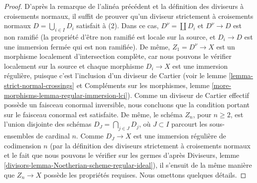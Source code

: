 \begin{proof}
\medskip\noindent
D'après la remarque de l'alinéa précédent et la définition
des diviseurs à croisements normaux, il suffit de prouver qu'un
diviseur strictement à croisements normaux $D = \bigcup_{i \in I} D_i$
satisfait à (2). Dans ce cas, $D^\nu = \coprod D_i$
et $D^\nu \to D$ est non ramifié (la propriété d'être non ramifié
est locale sur la source, et $D_i \to D$ est une immersion
fermée qui est non ramifiée). De même, $Z_1 = D^\nu \to X$
est un morphisme localement d'intersection complète, car nous pouvons
le vérifier localement sur la source et chaque morphisme $D_i \to X$
est une immersion régulière, puisque c'est l'inclusion d'un diviseur de Cartier
(voir le lemme \ref{lemma-strict-normal-crossings} et
Compléments sur les morphismes, lemme \ref{more-morphisms-lemma-regular-immersion-lci}).
Comme un diviseur de Cartier effectif possède un faisceau
conormal inversible, nous concluons que la condition portant sur le
faisceau conormal est satisfaite.
De même, le schéma $Z_n$, pour $n \geq 2$, est l'union disjointe
des schémas $D_J = \bigcap_{j \in J} D_j$, où $J \subset I$
parcourt les sous-ensembles de cardinal $n$. Comme $D_J \to X$ est
une immersion régulière de codimension $n$
(par la définition des diviseurs strictement à croisements normaux et le
fait que nous pouvons le vérifier sur les germes d'après
Diviseurs, lemme \ref{divisors-lemma-Noetherian-scheme-regular-ideal}),
il s'ensuit de la même manière que $Z_n \to X$ possède les propriétés
requises. Nous omettons quelques détails.


\end{proof}
